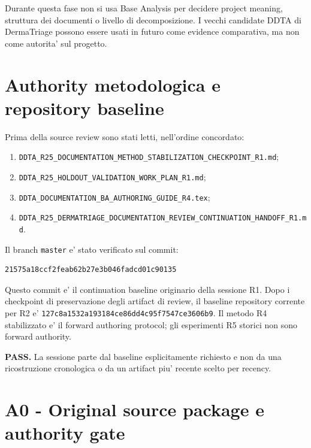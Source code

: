 \documentclass[11pt,a4paper]{article}
\begin{document}
\begin{ddtaanti}[title={Anti-contamination rule}]
Durante questa fase non si usa Base Analysis per decidere project meaning, struttura dei documenti o livello di decomposizione. I vecchi candidate DDTA di DermaTriage possono essere usati in futuro come evidence comparativa, ma non come autorita' sul progetto.
\end{ddtaanti}

\section{Authority metodologica e repository baseline}

Prima della source review sono stati letti, nell'ordine concordato:
\begin{enumerate}
  \item \texttt{DDTA\_R25\_DOCUMENTATION\_METHOD\_STABILIZATION\_CHECKPOINT\_R1.md};
  \item \texttt{DDTA\_R25\_HOLDOUT\_VALIDATION\_WORK\_PLAN\_R1.md};
  \item \texttt{DDTA\_DOCUMENTATION\_BA\_AUTHORING\_GUIDE\_R4.tex};
  \item \texttt{DDTA\_R25\_DERMATRIAGE\_DOCUMENTATION\_REVIEW\_CONTINUATION\_HANDOFF\_R1.md}.
\end{enumerate}

Il branch \texttt{master} e' stato verificato sul commit:
\begin{lstlisting}
21575a18ccf2feab62b27e3b046fadcd01c90135
\end{lstlisting}

Questo commit e' il continuation baseline originario della sessione R1. Dopo i checkpoint di preservazione degli artifact di review, il baseline repository corrente per R2 e' \texttt{127c8a1532a193184ce86dd4c95f7547ce3606b9}. Il metodo R4 stabilizzato e' il forward authoring protocol; gli esperimenti R5 storici non sono forward authority.

\begin{ddtacheck}[title={Repository authority gate}]
\textbf{PASS.} La sessione parte dal baseline esplicitamente richiesto e non da una ricostruzione cronologica o da un artifact piu' recente scelto per recency.
\end{ddtacheck}

\section{A0 - Original source package e authority gate}
\end{document}
